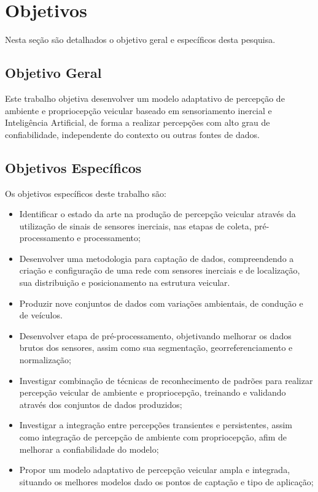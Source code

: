 \section{Objetivos}

Nesta seção são detalhados o objetivo geral e específicos desta pesquisa.

\subsection{Objetivo Geral}

Este trabalho objetiva desenvolver um modelo adaptativo de percepção de ambiente e propriocepção veicular baseado em sensoriamento inercial e Inteligência Artificial, de forma a realizar percepções com alto grau de confiabilidade, independente do contexto ou outras fontes de dados.

\subsection{Objetivos Específicos}

Os objetivos específicos deste trabalho são:

\begin{itemize}

\item Identificar o estado da arte na produção de percepção veicular através da utilização de sinais de sensores inerciais, nas etapas de coleta, pré-processamento e processamento;

\item Desenvolver uma metodologia para captação de dados, compreendendo a criação e configuração de uma rede com sensores inerciais e de localização, sua distribuição e posicionamento na estrutura veicular.

\item Produzir nove conjuntos de dados com variações ambientais, de condução e de veículos.

\item Desenvolver etapa de pré-processamento, objetivando melhorar os dados brutos dos sensores, assim como sua segmentação, georreferenciamento e normalização;

\item Investigar combinação de técnicas de reconhecimento de padrões para realizar percepção veicular de ambiente e propriocepção, treinando e validando através dos conjuntos de dados produzidos;

\item Investigar a integração entre percepções transientes e persistentes, assim como integração de percepção de ambiente com propriocepção, afim de melhorar a confiabilidade do modelo;

\item Propor um modelo adaptativo de percepção veicular ampla e integrada, situando os melhores modelos dado os pontos de captação e tipo de aplicação;

\end{itemize}


